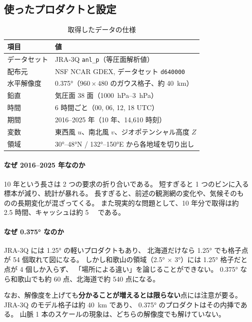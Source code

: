 \subsection{使ったプロダクトと設定}

\begin{table}[H]
\centering
\caption{取得したデータの仕様}
\begin{tabular}{ll}
\toprule
項目 & 値 \\
\midrule
データセット & JRA-3Q \texttt{anl\_p}（等圧面解析値）\\
配布元 & NSF NCAR GDEX, データセット \texttt{d640000} \\
水平解像度 & \ang{0.375}（$960 \times 480$ のガウス格子、約 \SI{40}{\kilo\metre}）\\
鉛直 & 気圧面 38 面（\SIrange{1000}{3}{\hecto\pascal}）\\
時間 & 6 時間ごと（00, 06, 12, 18 UTC）\\
期間 & 2016--2025 年（10 年、14{,}610 時刻）\\
変数 & 東西風 $u$、南北風 $v$、ジオポテンシャル高度 $Z$ \\
領域 & \ang{30}--\ang{48}N / \ang{132}--\ang{150}E から各地域を切り出し \\
\bottomrule
\end{tabular}
\end{table}

\paragraph{なぜ 2016--2025 年なのか}
10 年という長さは 2 つの要求の折り合いである。
短すぎると 1 つのビンに入る標本が減り、統計が暴れる。
長すぎると、前述の観測網の変化や、気候そのものの長期変化が混ざってくる。
また現実的な問題として、10 年分で取得は約 2.5 時間、キャッシュは約 \SI{5}{\giga\byte} である。

\paragraph{なぜ \ang{0.375} なのか}
JRA-3Q には \ang{1.25} の軽いプロダクトもあり、
北海道だけなら \ang{1.25} でも格子点が 54 個取れて図になる。
しかし和歌山の領域（\ang{2.5} $\times$ \ang{3}）には \ang{1.25} 格子だと点が 4 個しか入らず、
「場所による違い」を論じることができない。
\ang{0.375} なら和歌山でも約 60 点、北海道で約 540 点になる。

なお、解像度を上げても\textbf{分かることが増えるとは限らない}点には注意が要る。
JRA-3Q のモデル格子は約 \SI{40}{\kilo\metre} であり、
\ang{0.375} のプロダクトはその内挿である。
山脈 1 本のスケールの現象は、どちらの解像度でも解けていない。

